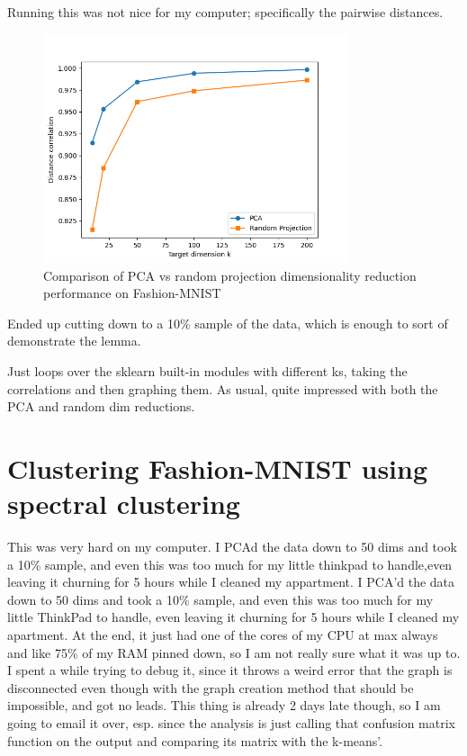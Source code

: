 \documentclass[letterpaper, 11pt]{amsart}
\begin{document}
Running this was not nice for my computer; specifically the pairwise distances.
\begin{figure}[h]
\centering
\includegraphics[width=0.8\textwidth]{plots/comparison_pca_vs_rand.png}
\caption{Comparison of PCA vs random projection dimensionality reduction performance on Fashion-MNIST}
\end{figure}
Ended up cutting down to a 10\% sample of the data, which is enough to sort of demonstrate the lemma.

Just loops over the sklearn built-in modules with different ks, taking the correlations and then graphing them. As usual, quite impressed with both the PCA and random dim reductions.

\section{Clustering Fashion-MNIST using spectral clustering}

This was very hard on my computer. 
I PCAd the data down to 50 dims and took a 10\% sample, and even this was too much for my little thinkpad to handle,even leaving it churning for 5 hours while I cleaned my appartment.
I PCA'd the data down to 50 dims and took a 10\% sample, and even this was too much for my little ThinkPad to handle, even leaving it churning for 5 hours while I cleaned my apartment.
At the end, it just had one of the cores of my CPU at max always and like 75\% of my RAM pinned down, so I am not really sure what it was up to.
I spent a while trying to debug it, since it throws a weird error that the graph is disconnected even though with the graph creation method that should be impossible, and got no leads. 
This thing is already 2 days late though, so I am going to email it over, esp. since the analysis is just calling that confusion matrix function on the output and comparing its matrix with the k-means'.
\end{document}
